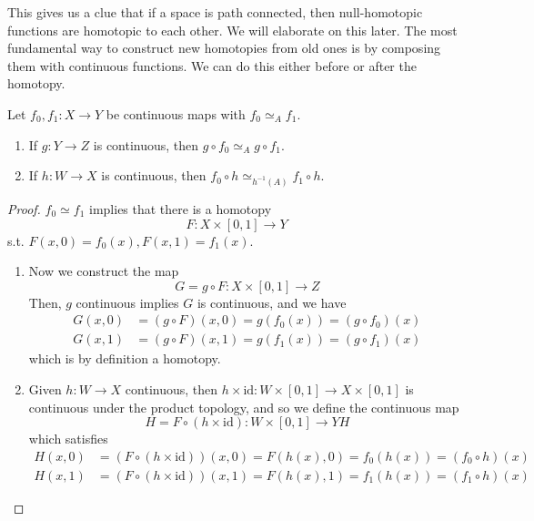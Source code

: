   This gives us a clue that if a space is path connected, then null-homotopic functions are homotopic to each other. We will elaborate on this later. The most fundamental way to construct new homotopies from old ones is by composing them with continuous functions. We can do this either before or after the homotopy. 

  \begin{lemma}
    Let $f_0, f_1: X \to Y$ be continuous maps with $f_0 \simeq_A f_1$. 
    \begin{enumerate}
      \item If $g: Y \to Z$ is continuous, then $g \circ f_0 \simeq_A g \circ f_1$. 
      \item If $h: W \to X$ is continuous, then $f_0 \circ h \simeq_{h^{-1}(A)} f_1 \circ h$. 
    \end{enumerate}
  \end{lemma}
  \begin{proof}
    $f_0 \simeq f_1$ implies that  there is a homotopy 
    \begin{equation}
      F: X \times [0, 1] \to Y
    \end{equation}
    s.t. $F(x, 0) = f_0 (x), F(x, 1) = f_1 (x)$. 
    \begin{enumerate}
      \item Now we construct the map 
        \begin{equation}
          G = g \circ F : X \times [0, 1] \to Z
        \end{equation}
        Then, $g$ continuous implies $G$ is continuous, and we have 
        \begin{align}
          G(x, 0) & = (g \circ F)(x, 0) = g(f_0(x)) = (g \circ f_0) (x) \\ 
          G(x, 1) & = (g \circ F)(x, 1) = g(f_1(x)) = (g \circ f_1) (x) 
        \end{align}
        which is by definition a homotopy. 
        
      \item Given $h: W \to X$ continuous, then $h \times \mathrm{id} : W \times [0, 1] \to X \times [0, 1]$ is continuous under the product topology, and so we define the continuous map 
        \begin{equation}
          H = F \circ (h \times \mathrm{id}): W \times [0, 1] \to YH
        \end{equation}
        which satisfies 
        \begin{align}
          H(x, 0) & =  (F \circ (h \times \mathrm{id})) (x, 0) = F(h(x), 0) = f_0(h(x)) = (f_0 \circ h) (x) \\ 
          H(x, 1) & =  (F \circ (h \times \mathrm{id})) (x, 1) = F(h(x), 1) = f_1(h(x)) = (f_1 \circ h) (x) 
        \end{align}
    \end{enumerate}
  \end{proof}

